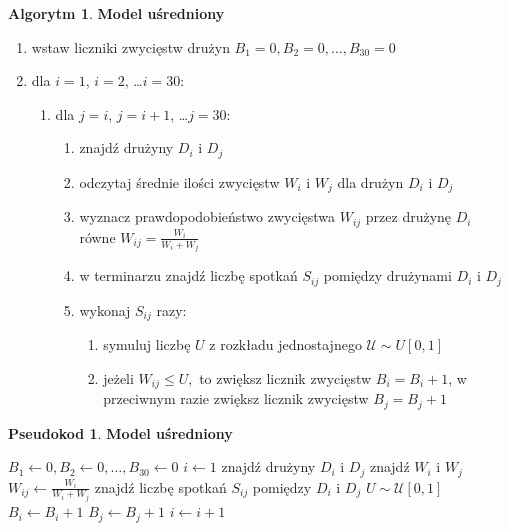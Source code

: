\documentclass[inzynierska]{pwr_wmat_praca_dyplomowa}
\theoremstyle{plain}
\numberwithin{theorem}{chapter}
\theoremstyle{definition}
\numberwithin{theorem}{chapter}
\newtheorem{algorytm}[theorem]{Algorytm}
\newtheorem{pseudokod}[theorem]{Pseudokod}
\begin{document}
\begin{algorytm} \label{algorytm1}
	\textbf{Model uśredniony}
	\begin{enumerate}
	\item wstaw liczniki zwycięstw drużyn $B_1= 0,B_2= 0,\dots, B_{30}= 0$
	\item dla $i=1$, $i=2$, \dots $i=30$: 
	\begin{enumerate}
		\item dla $j=i$, $j=i+1$, \dots $j=30$: 
		\begin{enumerate}
			\item znajdź drużyny $D_i$ i $D_j$
		\item odczytaj średnie ilości zwycięstw $W_i$ i $W_j$ dla drużyn $D_i$ i $D_j$ 
		\item wyznacz prawdopodobieństwo zwycięstwa $W_{ij}$ przez drużynę  $D_i$ równe $W_{ij}=\frac{W_i}{W_i + W_j}$   
		\item w terminarzu znajdź liczbę spotkań $S_{ij}$ pomiędzy drużynami $D_i$ i $D_j$
		\item wykonaj $S_{ij}$ razy:
			\begin{enumerate}
				\item symuluj liczbę $U$ z rozkładu jednostajnego $\mathcal{U}\sim U[0,1]$ 
			\item jeżeli $W_{ij} \leq U,$ to zwiększ licznik zwycięstw $B_i=B_i+1$, w przeciwnym razie zwiększ licznik zwycięstw $B_j=B_j+1$
			\end{enumerate}
		\end{enumerate}
	\end{enumerate}
\end{enumerate}
\end{algorytm} 
 
\begin{pseudokod} \label{pseudokod1}
	\textbf{Model uśredniony}
	\begin{algorithmic}[1]
		\State $B_1\gets 0,B_2\gets 0,\dots, B_{30}\gets 0$
		\State $i\gets 1$
		\State znajdź drużyny $D_i$ i $D_j$
		\State znajdź $W_i$ i $W_j$ 
		\State $W_{ij}\gets\frac{W_i}{W_i + W_j}$
		\State znajdź liczbę spotkań $S_{ij}$ pomiędzy $D_i$ i $D_j$
		\State $U\sim \mathcal{U}[0,1]$
		\State $B_i \gets B_i+1$
		\Else
		\State $B_j \gets B_j+1$
		\EndIf
		\EndFor
		\EndFor
		\State $i\gets i+1$
		\EndWhile
	\end{algorithmic}
\end{pseudokod}
\end{document}
